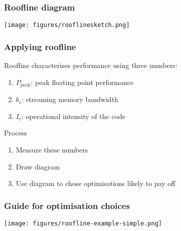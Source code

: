 \documentclass[dvipsnames,presentation,aspectratio=169,14pt]{beamer}
\begin{document}
\begin{frame}
  \frametitle{Roofline diagram}
  \begin{center}
    \texttt{[image: figures/rooflinesketch.png]}
  \end{center}
\end{frame}

\begin{frame}
  \frametitle{Applying roofline}
  Roofline characterises performance using three numbers:
  \vskip 6pt
    \begin{enumerate}[itemsep=6pt,leftmargin=60pt]
    \item[\structure{HW1.}] $P_\text{peak}$: peak floating point performance
    \item[\structure{HW2.}] $b_s$: streaming memory bandwidth
    \item[\structure{SW1.}] $I_c$: operational intensity of the code
    \end{enumerate}

    \vskip 5pt

    \begin{answer}{Process}
      \begin{enumerate}[wide=0pt]
      \item Measure these numbers
      \item Draw diagram
      \item Use diagram to chose optimisations likely to pay off
    \end{enumerate}
  \end{answer}
\end{frame}

\begin{frame}
  \frametitle{Guide for optimisation choices}
  \vskip -4pt
  \begin{center}
    \texttt{[image: figures/roofline-example-simple.png]}
  \end{center}
\end{frame}
\end{document}
